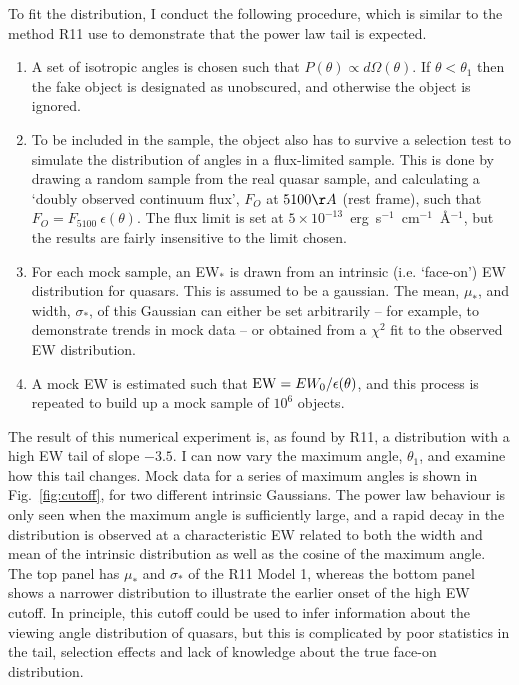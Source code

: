 To fit the distribution, I conduct the following procedure,
which is similar to the method R11 use to demonstrate that the power
law tail is expected.
\begin{enumerate}
	\setlength\itemsep{1em}
	\item A set of isotropic angles is chosen such that 
	$P(\theta)\propto d\Omega(\theta)$. 
	If $\theta<\theta_{1}$ then the fake object is designated as unobscured, 
	and otherwise the object is ignored. 
	\item To be included in the sample, the object also has to 
	survive a selection test
	to simulate the distribution of angles in a flux-limited sample.
	This is done by drawing a random sample from the real quasar sample, 
	and calculating a `doubly observed continuum flux', $F_O$ at $5100\AA$ 
	(rest frame), such that $F_O = F_{5100}~\epsilon(\theta)$. The flux limit
	is set at $5\times10^{-13}$~erg~s$^{-1}$~cm$^{-1}$~\AA$^{-1}$, but the results
	are fairly insensitive to the limit chosen.
	\item For each mock sample, an EW$_*$ is drawn from an intrinsic 
	(i.e. `face-on') EW distribution for quasars. This is assumed to be a
	gaussian. The mean, $\mu_*$, and width, $\sigma_*$, of this Gaussian
	can either be set arbitrarily -- for example, to demonstrate trends
	in mock data -- or obtained from a $\chi^2$ fit to the observed EW
	distribution.
	\item A mock EW is estimated such that ${\rm EW} = EW_0 / \epsilon(\theta)$,
	and this process is repeated to build up a mock sample of $10^6$ objects.
\end{enumerate}
The result of this numerical experiment is, as found by R11, a distribution
with a high EW tail of slope $-3.5$. I can now vary the maximum angle, $\theta_1$,
and examine how this tail changes. Mock data for a series
of maximum angles is shown in Fig.~\ref{fig:cutoff}, for two different intrinsic 
Gaussians. The power law behaviour is only seen when the maximum angle is
sufficiently large, and a rapid decay in the distribution is observed
at a characteristic EW related to both the width and mean of the
intrinsic distribution as well as the cosine of the maximum angle.
The top panel has $\mu_*$ and $\sigma_*$ of the R11 Model 1, 
whereas the bottom panel shows a narrower distribution to illustrate the 
earlier onset of the high EW cutoff. In principle, this cutoff could
be used to infer information about the viewing angle distribution
of quasars, but this is complicated by poor statistics in the tail,
selection effects and lack of knowledge about the true face-on
distribution.

